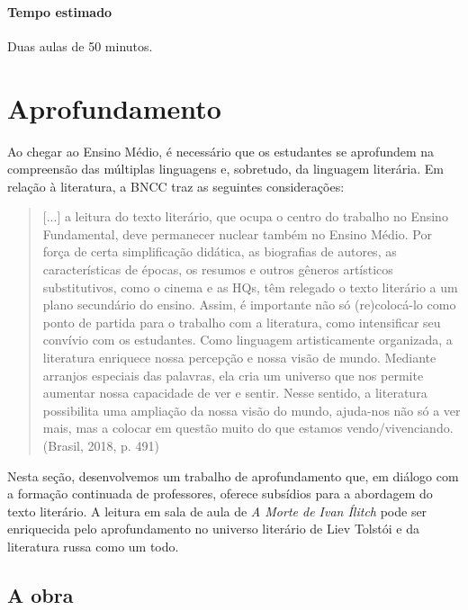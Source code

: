 \documentclass[12pt]{extarticle}
\begin{document}
\paragraph{Tempo estimado} Duas aulas de 50 minutos.


\section{Aprofundamento}

Ao chegar ao Ensino Médio, é necessário que os estudantes se aprofundem
na compreensão das múltiplas linguagens e, sobretudo, da linguagem
literária. Em relação à literatura, a BNCC traz as seguintes
considerações:

\begin{quote}
{[}...{]} a leitura do texto literário, que ocupa o centro do trabalho
no Ensino Fundamental, deve permanecer nuclear também no Ensino Médio.
Por força de certa simplificação didática, as biografias de autores, as
características de épocas, os resumos e outros gêneros artísticos
substitutivos, como o cinema e as HQs, têm relegado o texto literário a
um plano secundário do ensino. Assim, é importante não só (re)colocá-lo
como ponto de partida para o trabalho com a literatura, como
intensificar seu convívio com os estudantes. Como linguagem
artisticamente organizada, a literatura enriquece nossa percepção e
nossa visão de mundo. Mediante arranjos especiais das palavras, ela cria
um universo que nos permite aumentar nossa capacidade de ver e sentir.
Nesse sentido, a literatura possibilita uma ampliação da nossa visão do
mundo, ajuda-nos não só a ver mais, mas a colocar em questão muito do
que estamos vendo/vivenciando. (Brasil, 2018, p. 491)
\end{quote}

Nesta seção, desenvolvemos um trabalho de aprofundamento que, em diálogo
com a formação continuada de professores, oferece subsídios para a
abordagem do texto literário. A leitura em sala de aula de \emph{A Morte
de Ivan Ílitch} pode ser enriquecida pelo aprofundamento no universo
literário de Liev Tolstói e da literatura russa como um todo.




\subsection{A obra}
\end{document}
